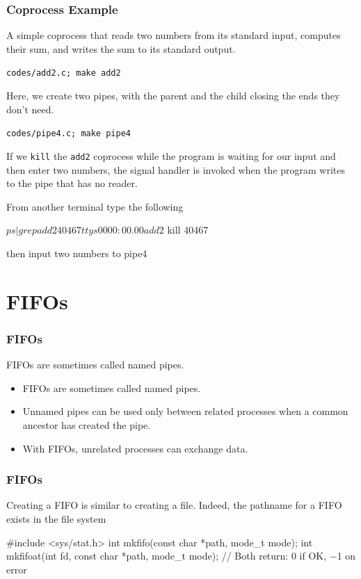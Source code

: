 \documentclass[newPxFont,sthlmFooter,nooffset]{beamer}
\begin{document}
\begin{frame}
  \frametitle{Coprocess Example}
A simple coprocess that reads two numbers from its standard input, computes their sum, and writes the sum to its standard output.

\texttt{codes/add2.c; make add2}



\bigskip

Here, we create two pipes, with the parent and the child closing the ends they don’t need.

\newpage
\texttt{codes/pipe4.c; make pipe4}


\newpage
If we \texttt{kill} the \texttt{add2} coprocess while the program is waiting for our input and then enter two numbers, the signal handler is invoked when the program writes to the pipe that has no reader.

From another terminal type the following
\begin{codedefnb}
$ ps | grep add2
40467  ttys000  0:00.00 add2
$ kill 40467
\end{codedefnb}

then input two numbers to pipe4

\end{frame}

\section{FIFOs}

\begin{frame}[t]
  \frametitle{FIFOs}
FIFOs are sometimes called named pipes.
\begin{itemize}
\item FIFOs are sometimes called named pipes.
\item Unnamed pipes can be used only between related processes when a common ancestor has created the pipe.
\item With FIFOs, unrelated processes can exchange data.
\end{itemize}


\end{frame}



\begin{frame}[t, fragile]
  \frametitle{FIFOs}
Creating a FIFO is similar to creating a file. Indeed, the pathname for a FIFO exists in the file system
\begin{codedef}
 #include <sys/stat.h>
int mkfifo(const char *path, mode_t mode);
int mkfifoat(int fd, const char *path, mode_t mode);
// Both return: 0 if OK, −1 on error
\end{codedef}

\end{frame}
\end{document}
